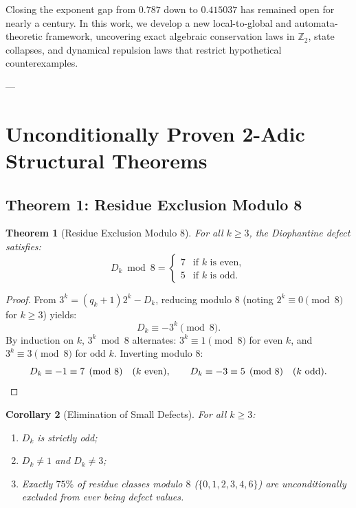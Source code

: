 \documentclass[11pt,reqno]{amsart}
\newtheorem{theorem}{Theorem}[section]
\newtheorem{corollary}[theorem]{Corollary}
\theoremstyle{definition}
\numberwithin{equation}{section}
\begin{document}
Closing the exponent gap from $0.787$ down to $0.415037$ has remained open for nearly a century. In this work, we develop a new local-to-global and automata-theoretic framework, uncovering exact algebraic conservation laws in $\mathbb{Z}_2$, state collapses, and dynamical repulsion laws that restrict hypothetical counterexamples.

---

\section{Unconditionally Proven 2-Adic Structural Theorems}

\subsection{Theorem 1: Residue Exclusion Modulo 8}

\begin{theorem}[Residue Exclusion Modulo 8]\label{thm:mod8}
For all $k \ge 3$, the Diophantine defect satisfies:
\begin{equation}
D_k \bmod 8 = \begin{cases}
7 & \text{if } k \text{ is even}, \\
5 & \text{if } k \text{ is odd}.
\end{cases}
\end{equation}
\end{theorem}

\begin{proof}
From $3^k = (q_k + 1)2^k - D_k$, reducing modulo $8$ (noting $2^k \equiv 0 \pmod 8$ for $k \ge 3$) yields:
\[
D_k \equiv -3^k \pmod 8.
\]
By induction on $k$, $3^k \bmod 8$ alternates: $3^k \equiv 1 \pmod 8$ for even $k$, and $3^k \equiv 3 \pmod 8$ for odd $k$.
Inverting modulo $8$:
\[
D_k \equiv -1 \equiv 7 \pmod 8 \quad (k \text{ even}), \qquad D_k \equiv -3 \equiv 5 \pmod 8 \quad (k \text{ odd}). \qedhere
\]
\end{proof}

\begin{corollary}[Elimination of Small Defects]\label{cor:small_defects}
For all $k \ge 3$:
\begin{enumerate}
    \item $D_k$ is strictly odd;
    \item $D_k \ne 1$ and $D_k \ne 3$;
    \item Exactly $75\%$ of residue classes modulo $8$ ($\{0, 1, 2, 3, 4, 6\}$) are unconditionally excluded from ever being defect values.
\end{enumerate}
\end{corollary}
\end{document}
